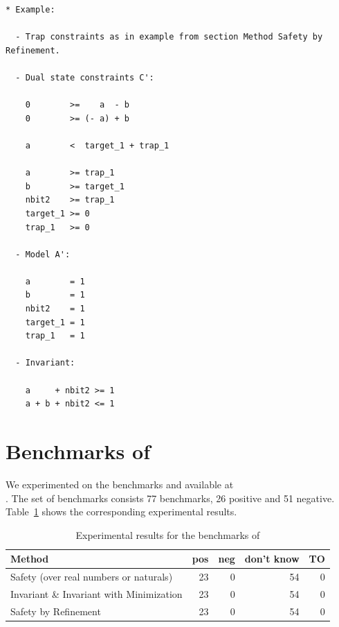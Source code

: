 \documentclass{llncs}
\begin{document}
\begin{verbatim}
* Example:

  - Trap constraints as in example from section Method Safety by Refinement.
  
  - Dual state constraints C':

    0        >=    a  - b
    0        >= (- a) + b

    a        <  target_1 + trap_1

    a        >= trap_1
    b        >= target_1
    nbit2    >= trap_1
    target_1 >= 0
    trap_1   >= 0

  - Model A':

    a        = 1
    b        = 1
    nbit2    = 1
    target_1 = 1
    trap_1   = 1
    
  - Invariant:

    a     + nbit2 >= 1
    a + b + nbit2 <= 1

\end{verbatim}


\iffalse

\newpage
\section{Benchmarks of \bfc}

We experimented on the benchmarks  and
 available at \\
.
The set of benchmarks consists 77 benchmarks, 26 positive and 51 negative.
Table~\ref{bfc-experiments} shows the corresponding experimental results.

\begin{table}[h]
\begin{center}
  \begin{tabular}{ | p{7cm} | r | r | r | r | } %
    \hline
    Method & pos & neg & don't know & TO \\
    \hline
    Safety (over real numbers or naturals)      & 23 &  0 & 54 &  0 \\
    Invariant \& Invariant with Minimization    & 23 &  0 & 54 &  0 \\
    Safety by Refinement                        & 23 &  0 & 54 &  0 \\
    \hline
  \end{tabular}
\end{center}
\caption{Experimental results for the benchmarks of \bfc}
\label{bfc-experiments}
\end{table}
\end{document}
